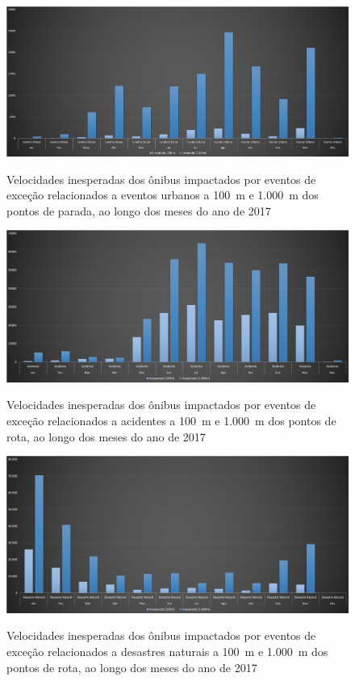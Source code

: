 \documentclass[
	12pt,				%
	oneside,			%
	a4paper,			%
	english,			%
	brazil				%
	]{abntex2ppgsi}
\begin{document}
{{\begin{figure}[!htb]
	\centering
 	  \caption{Velocidades inesperadas dos ônibus impactados por eventos de exceção relacionados a eventos urbanos a 100~m e 1.000~m dos pontos de parada, ao longo dos meses do ano de 2017}
		\includegraphics[width=1\linewidth]{images/apriori_analysis_stops_urban_events.png}
	\label{fig:apriori_analysis_stops_urban_events}
\end{figure}

\begin{figure}[!htb]
	\centering
 	  \caption{Velocidades inesperadas dos ônibus impactados por eventos de exceção relacionados a acidentes a 100~m e 1.000~m dos pontos de rota, ao longo dos meses do ano de 2017}
		\includegraphics[width=1\linewidth]{images/apriori_analysis_shapes_accidents.png}
	\label{fig:apriori_analysis_shapes_accidents}
\end{figure}

\begin{figure}[!htb]
	\centering
 	  \caption{Velocidades inesperadas dos ônibus impactados por eventos de exceção relacionados a desastres naturais a 100~m e 1.000~m dos pontos de rota, ao longo dos meses do ano de 2017}
		\includegraphics[width=1\linewidth]{images/apriori_analysis_shapes_natural_disasters.png}
	\label{fig:apriori_analysis_shapes_natural_disasters}
\end{figure}

}}
\end{document}
